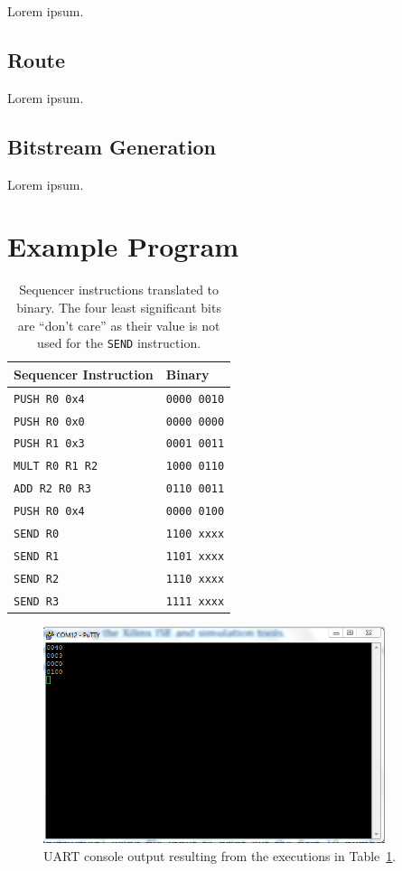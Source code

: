 \documentclass[]{article}
\begin{document}
Lorem ipsum.

\subsection{Route}

Lorem ipsum.

\subsection{Bitstream Generation}

Lorem ipsum.

\section{Example Program}

\begin{table}[H]
\centering
\begin{tabular}{ l | l }
\textbf{Sequencer Instruction} & \textbf{Binary}\\\hline
\texttt{PUSH R0 0x4} & \texttt{0000 0010}\\
\texttt{PUSH R0 0x0} & \texttt{0000 0000}\\
\texttt{PUSH R1 0x3} & \texttt{0001 0011}\\
\texttt{MULT R0 R1 R2} & \texttt{1000 0110}\\
\texttt{ADD R2 R0 R3} & \texttt{0110 0011}\\
\texttt{PUSH R0 0x4} & \texttt{0000 0100}\\
\texttt{SEND R0} & \texttt{1100  xxxx}\\
\texttt{SEND R1} & \texttt{1101  xxxx}\\
\texttt{SEND R2} & \texttt{1110  xxxx}\\
\texttt{SEND R3} & \texttt{1111  xxxx}\\
\end{tabular}
\caption{Sequencer instructions translated to binary. The four least significant bits are ``don't care'' as their value is not used for the \texttt{SEND} instruction.}
\label{table:translation}
\end{table}

\begin{figure}[H]
\centering
\includegraphics[width=10cm]{translation.PNG}
\caption{UART console output resulting from the executions in Table~\ref{table:translation}.}
\end{figure}
\end{document}
